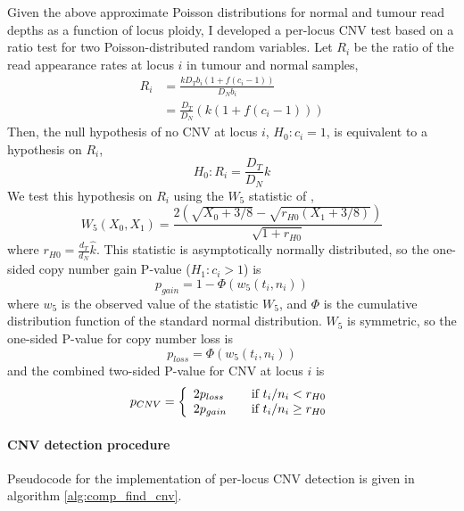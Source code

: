 \documentclass[thesis.tex]{subfiles}
\begin{document}
Given the above approximate Poisson distributions for normal and tumour read depths as a function of locus ploidy, I developed a per-locus \gls{CNV} test based on a ratio test for two Poisson-distributed random variables.  Let $R_i$ be the ratio of the read appearance rates at locus $i$ in tumour and normal samples, 
\begin{align}
  R_i &= \frac{k D_T b_i \left( 1 + f \left(c_i - 1\right) \right)}{D_N b_i} \\
      &= \frac{D_T}{D_N} \left( k \left( 1 + f \left( c_i - 1 \right)\right) \right)
\end{align}
Then, the null hypothesis of no \gls{CNV} at locus $i$, $H_0: c_i = 1$, is equivalent to a hypothesis on $R_i$, 
\begin{equation}
H_0: R_i = \frac{D_T}{D_N}k
\end{equation}
We test this hypothesis on $R_i$ using the $W_5$ statistic of \cite{Gu2008},
\begin{equation}
  W_5(X_0, X_1) = \frac{2\left(\sqrt{X_0 + 3/8} - \sqrt{r_{H0}\left(X_1 + 3/8\right)}\right)}{\sqrt{1 + r_{H0}}}
\end{equation}
where $r_{H0} = \frac{d_T}{d_N}\hat{k}$.  This statistic is asymptotically normally distributed, so the one-sided copy number gain P-value ($H_1: c_i > 1$) is
\begin{equation}
  p_{gain} = 1 - \Phi\left(w_5(t_i, n_i)\right)
\end{equation}
where $w_5$ is the observed value of the statistic $W_5$, and $\Phi$ is the cumulative distribution function of the standard normal distribution.  $W_5$ is symmetric, so the one-sided P-value for copy number loss is
\begin{equation}
  p_{loss} = \Phi\left(w_5(t_i, n_i)\right)
\end{equation}
and the combined two-sided P-value for \gls{CNV} at locus $i$ is
\begin{equation}
  p_{CNV} = \left\{ 
    \begin{array}{l l}
      2 p_{loss} & \quad \text{if $t_i/n_i < r_{H0}$} \\
      2 p_{gain} & \quad \text{if $t_i/n_i \geq r_{H0}$}
    \end{array}
  \right.
\end{equation}

\paragraph{\Acrshort{CNV} detection procedure}
Pseudocode for the implementation of per-locus \gls{CNV} detection is given in algorithm \ref{alg:comp_find_cnv}.  
\end{document}
